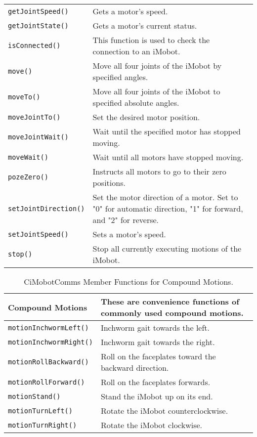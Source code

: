 \begin{table}[!hp]
\begin{center}
\begin{tabular}{p{38 mm}p{77 mm}}
\texttt{getJointSpeed()} \dotfill & Gets a motor's speed. \\
\texttt{getJointState()} \dotfill & Gets a motor's current status. \\
\texttt{isConnected()} \dotfill & This function is used to check the connection to an iMobot. \\
\texttt{move()} \dotfill & Move all four joints of the iMobot by specified angles. \\
\texttt{moveTo()} \dotfill & Move all four joints of the iMobot to specified absolute angles. \\
\texttt{moveJointTo()} \dotfill & Set the desired motor position. \\
\texttt{moveJointWait()} \dotfill & Wait until the specified motor has stopped moving. \\
\texttt{moveWait()} \dotfill & Wait until all motors have stopped moving. \\
\texttt{pozeZero()} \dotfill & Instructs all motors to go to their zero positions. \\
\texttt{setJointDirection()} \dotfill & Set the motor direction of a motor. Set
to "0" for automatic direction, "1" for forward, and "2" for reverse. \\
\texttt{setJointSpeed()} \dotfill & Sets a motor's speed. \\
\texttt{stop()} \dotfill & Stop all currently executing motions of the iMobot. \\
\hline
\end{tabular}
\end{center}
\label{mobilec_api_cbinary}
\end{table}

\begin{table}[!h]
\begin{center}
\caption{CiMobotComms Member Functions for Compound Motions.}
\begin{tabular}{p{38 mm}p{77 mm}}
Compound Motions & These are convenience functions of commonly used compound motions. \\
\hline
\texttt{motionInchwormLeft()} \dotfill & Inchworm gait towards the left. \\
\texttt{motionInchwormRight()} \dotfill & Inchworm gait towards the right. \\
\texttt{motionRollBackward()} \dotfill & Roll on the faceplates toward the backward direction. \\
\texttt{motionRollForward()} \dotfill & Roll on the faceplates forwards. \\
\texttt{motionStand()} \dotfill & Stand the iMobot up on its end. \\
\texttt{motionTurnLeft()} \dotfill & Rotate the iMobot counterclockwise. \\
\texttt{motionTurnRight()} \dotfill & Rotate the iMobot clockwise. \\
\hline
\end{tabular}
\end{center}
\label{mobilec_api_compound}
\end{table}

